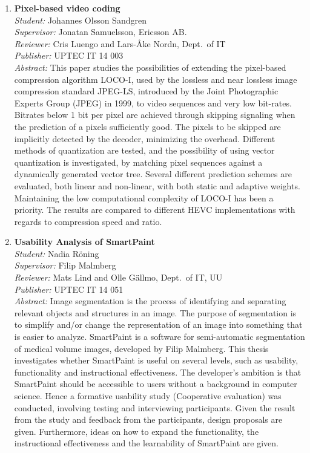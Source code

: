 \begin{small}
\begin{enumerate}
\item\textbf{Pixel-based video coding}\\
  \emph{Student:} Johannes Olsson Sandgren\\
  \emph{Supervisor:} Jonatan Samuelsson, Ericsson AB.\\
  \emph{Reviewer:} Cris Luengo and Lars-Åke Nordn, Dept.~of IT\\
  \emph{Publisher:} UPTEC IT 14 003\\
  \emph{Abstract:} This paper studies the possibilities of extending the pixel-based compression algorithm LOCO-I, used by the lossless and near lossless image compression standard JPEG-LS, introduced by the Joint Photographic Experts Group (JPEG) in 1999, to video sequences and very low bit-rates. Bitrates below 1 bit per pixel are achieved through skipping signaling when the prediction of a pixels sufficiently good. The pixels to be skipped are implicitly detected  by the decoder, minimizing the overhead. Different methods of quantization are tested, and the possibility of using vector quantization is investigated, by matching pixel sequences against a dynamically generated vector tree. Several different prediction schemes are evaluated, both linear and non-linear, with both static and adaptive weights.  Maintaining the low computational complexity of LOCO-I has been a priority. The results are compared to different HEVC implementations with regards to compression speed and ratio.

\item\textbf{Usability Analysis of SmartPaint}\\
  \emph{Student:} Nadia Röning \\
  \emph{Supervisor:} Filip Malmberg\\
  \emph{Reviewer:} Mats Lind and Olle Gällmo, Dept.~of IT, UU\\
  \emph{Publisher:} UPTEC IT 14 051\\
  \emph{Abstract:} Image segmentation is the process of identifying and separating relevant objects and structures in an image. The purpose of segmentation is to simplify and/or change the representation of an image into something that is easier to analyze. SmartPaint is a software for semi-automatic segmentation of medical volume  images, developed by Filip Malmberg.  This thesis investigates whether SmartPaint is useful on several levels, such as usability, functionality and instructional effectiveness. The developer's ambition is that SmartPaint should be accessible to users without a background in computer science. Hence a formative usability study (Cooperative evaluation) was conducted, involving testing and interviewing participants. Given  the result from the study and feedback from the participants, design proposals are given. Furthermore, ideas on how to expand the functionality, the instructional effectiveness and the learnability of SmartPaint are given.


\end{enumerate}
\end{small}

